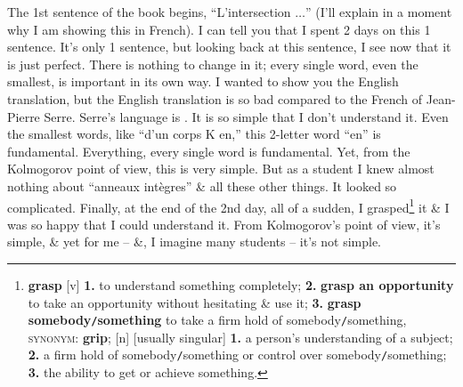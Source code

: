 \documentclass[oneside]{book}
\numberwithin{equation}{section}
\begin{document}
The 1st sentence of the book begins, ``L'intersection $\ldots$'' (I'll explain in a moment why I am showing this in French). I can tell you that I spent 2 days on this 1 sentence. It's only 1 sentence, but looking back at this sentence, I see now that it is just perfect. There is nothing to change in it; every single word, even the smallest, is important in its own way. I wanted to show you the English translation, but the English translation is so bad compared to the French of Jean-Pierre Serre. Serre's language is . It is so simple that I don't understand it. Even the smallest words, like ``d'un corps K en,'' this 2-letter word ``en'' is fundamental. Everything, every single word is fundamental. Yet, from the Kolmogorov point of view, this is very simple. But as a student I knew almost nothing about ``anneaux int\`egres'' \& all these other things. It looked so complicated. Finally, at the end of the 2nd day, all of a sudden, I grasped\footnote{\textbf{grasp} [v] \textbf{1.} to understand something completely; \textbf{2.} \textbf{grasp an opportunity} to take an opportunity without hesitating \& use it; \textbf{3.} \textbf{grasp somebody\texttt{/}something} to take a firm hold of somebody\texttt{/}something, \textsc{synonym}: \textbf{grip}; [n] [usually singular] \textbf{1.} a person's understanding of a subject; \textbf{2.} a firm hold of somebody\texttt{/}something or control over somebody\texttt{/}something; \textbf{3.} the ability to get or achieve something.} it \& I was so happy that I could understand it. From Kolmogorov's point of view, it's simple, \& yet for me -- \&, I imagine many students -- it's not simple.
\end{document}
